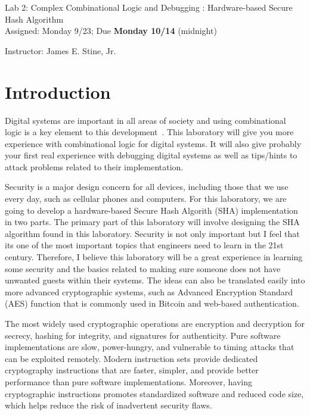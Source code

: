 \documentclass{article}
\newcommand{\myassignment}{Lab 2: Complex Combinational Logic and Debugging : Hardware-based Secure Hash Algorithm}
\newcommand{\myduedate}{Assigned: Monday 9/23; Due \textbf{Monday 10/14} (midnight)}
\newcommand{\myinstructor}{Instructor: James E. Stine, Jr.}
\begin{document}
\begin{center}
  {\huge \myassignment} \\
  {\large \myduedate} \\
  \begin{flushright}
  \myinstructor \\
  \end{flushright}
\end{center}

\section{Introduction}

Digital systems are important in all areas of society and using
combinational logic is a key element to this
development~\cite{ddca-riscv}.  This
laboratory will give you more experience with combinational logic
for digital systems.  It will also give probably your first real
experience with debugging digital systems as well as tips/hints to
attack problems related to their implementation.

Security is a major design concern for all devices, including those
that we
use every day, such as cellular phones and computers.
For this laboratory, we are going to develop a hardware-based Secure
Hash Algorith (SHA)
implementation
in two parts.  The primary part of this laboratory will involve designing the 
SHA algorithm found in this laboratory.
Security is not only important but I feel that its one of the most important
topics that engineers
need to learn in the 21st century.  Therefore, I
believe this laboratory will be a great experience in learning some
security and the basics related to making sure someone does not have
unwanted guests within their systems.  The ideas can also be
translated easily into more advanced cryptographic systems, such as
Advanced Encryption Standard (AES) function that is
commonly used in Bitcoin and web-based authentication.

The most widely used cryptographic operations are encryption and
decryption for secrecy, hashing for integrity, and signatures for
authenticity. Pure software implementations are slow, power-hungry,
and vulnerable to timing attacks that can be exploited
remotely. Modern instruction sets provide dedicated cryptography
instructions that are faster, simpler, and provide better performance
than pure software implementations. Moreover, having cryptographic
instructions promotes standardized software and reduced code size,
which helps reduce the risk of inadvertent security flaws. 
\end{document}

